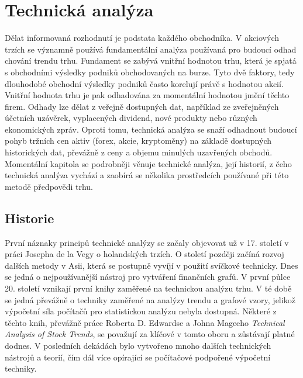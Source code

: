 \chapter{Technická analýza}
\label{chap:TechnicalAnalysis}
Dělat informovaná rozhodnutí je podstata každého obchodníka. V akciových trzích se významně používá fundamentální analýza používaná pro budoucí odhad
chování trendu trhu. Fundament se zabývá vnitřní hodnotou trhu, která je spjatá s obchodními výsledky podniků obchodovaných na burze. Tyto dvě faktory,
tedy dlouhodobé obchodní výsledky podniků často korelují právě s hodnotou akcií. Vnitřní hodnota trhu je pak odhadována za momentální hodnotou jmění
těchto firem. Odhady lze dělat z veřejně dostupných dat, například ze zveřejněných účetních uzávěrek, vyplacených dividend, nové produkty nebo různých ekonomických zpráv.
Oproti tomu, technická analýza se snaží odhadnout budoucí pohyb tržních cen aktiv (forex, akcie, kryptoměny) na základě dostupných historických dat, převážně
z ceny a objemu minulých uzavřených obchodů. Momentální kapitola se podrobněji věnuje technické analýza, její historií, z čeho technická analýza vychází
a zaobírá se několika prostředcích používané při této metodě předpovědi trhu.


\section{Historie}
První náznaky principů technické analýzy se začaly objevovat už v 17. století v práci Josepha de la Vegy o holandských trzích. O století později začíná
rozvoj dalších metody v Asii, která se postupně vyvíjí v použití svíčkové technicky. Dnes se jedná o nejpoužívanější nástroj pro vytváření finančních grafů.
V první půlce 20. století vznikají první knihy zaměřené na technickou analýzu trhu. V té době se jedná převážně o techniky zaměřené na analýzy trendu a
grafové vzory, jelikož výpočetní síla počítačů pro statistickou analýzu nebyla dostupná. Některé z těchto knih, převážně práce Roberta D. Edwardse a Johna
Mageeho \emph{Technical Analysis of Stock Trends}, se považují za klíčové v tomto oboru a zůstávají platné dodnes. V posledních dekádách bylo vytvořeno
mnoho dalších technických nástrojů a teorií, čím dál více opírající se počítačové podpořené výpočetní techniky.


